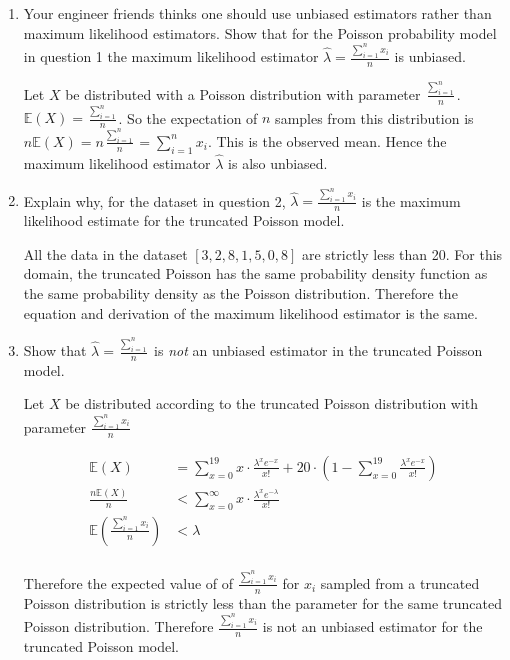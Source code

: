 \documentclass[10pt,\jkfside,a4paper]{article}
\begin{document}
\begin{enumerate}
\begin{enumerate}
\item Your engineer friends thinks one should use unbiased estimators rather
than maximum likelihood estimators. Show that for the Poisson probability
model in question 1 the maximum likelihood estimator $\hat{\lambda} =
\frac{\sum^n_{i=1}x_i}{n}$ is unbiased.

Let $X$ be distributed with a Poisson distribution with parameter
$\frac{\sum^n_{i=1}}{n}$. $\mathbb{E}\left( X \right) = \frac{\sum^n_{i=1}}{n}$.
So the expectation of $n$ samples from this distribution is
$n\mathbb{E}\left( X \right) = n\frac{\sum^n_{i=1}}{n} = \sum^n_{i=1} x_i$.
This is the observed mean. Hence the maximum likelihood estimator
$\hat{\lambda}$ is also unbiased.

\item Explain why, for the dataset in question 2, $\hat{\lambda} =
\frac{\sum^n_{i=1}x_i}{n} $ is the maximum likelihood estimate for the
truncated Poisson model.

All the data in the dataset $[3, 2, 8, 1, 5, 0, 8]$ are strictly less than
20. For this domain, the truncated Poisson has the same probability density
function as the same probability density as the Poisson distribution.
Therefore the equation and derivation of the maximum likelihood estimator is
the same.

\item Show that $\hat{\lambda} = \frac{\sum^n_{i=1}}{n}$ is \textit{not} an
unbiased estimator in the truncated Poisson model.

Let $X$ be distributed according to the truncated Poisson distribution with
parameter $\frac{\sum^n_{i=1}x_i}{n}$

\[
\begin{split}
\mathbb{E}(X) &= \sum^{19}_{x=0} x\cdot\frac{\lambda^x e^{-x}}{x!} +
20\cdot\left( 1 - \sum^{19}_{x=0} \frac{\lambda^x e^{-x}}{x!} \right) \\
\frac{n\mathbb{E}(X)}{n} &< \sum^{\infty}_{x=0} x\cdot\frac{\lambda^x
e^{-\lambda}}{x!} \\
\mathbb{E}\left(\frac{\sum^n_{i=1}x_i}{n}\right) &< \lambda \\
\end{split}
\]

Therefore the expected value of of $\frac{\sum^n_{i=1}x_i}{n}$ for $x_i$
sampled from a truncated Poisson distribution is strictly less than the
parameter for the same truncated Poisson distribution. Therefore
$\frac{\sum^n_{i=1}x_i}{n}$ is not an unbiased estimator for the truncated
Poisson model.


\end{enumerate}
\end{enumerate}
\end{document}
